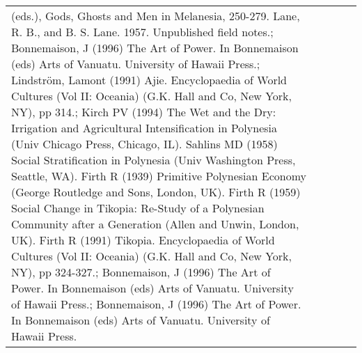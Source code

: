 \begin{table}[ht]
\begin{tabular}{p{5cm}p{2cm}p{2cm}p{2cm}p{2cm}}
(eds.), Gods, Ghosts and Men in Melanesia, 250-279. Lane, R. B., and B. S. Lane. 1957. Unpublished field notes.; Bonnemaison, J (1996) The Art of Power. In Bonnemaison (eds) Arts of Vanuatu. University of Hawaii Press.; Lindström, Lamont (1991) Ajie. Encyclopaedia of World Cultures (Vol II: Oceania) (G.K. Hall and Co, New York, NY), pp 314.; Kirch PV (1994) The Wet and the Dry: Irrigation and Agricultural Intensification in Polynesia (Univ Chicago Press, Chicago, IL). Sahlins MD (1958) Social Stratification in Polynesia (Univ Washington Press, Seattle, WA). Firth R (1939) Primitive Polynesian Economy (George Routledge and Sons, London, UK). Firth R (1959) Social Change in Tikopia: Re-Study of a Polynesian Community after a Generation (Allen and Unwin, London, UK). Firth R (1991) Tikopia. Encyclopaedia of World Cultures (Vol II: Oceania) (G.K. Hall and Co, New York, NY), pp 324-327.; Bonnemaison, J (1996) The Art of Power. In Bonnemaison (eds) Arts of Vanuatu. University of Hawaii Press.; Bonnemaison, J (1996) The Art of Power. In Bonnemaison (eds) Arts of Vanuatu. University of Hawaii Press. \\ 

\end{tabular}
\end{table}
